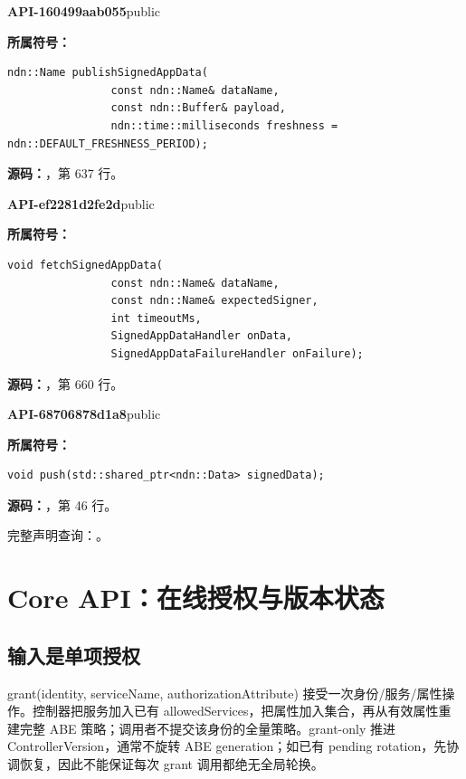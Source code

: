 \textbf{API-160499aab055}\quad public\par
\textbf{所属符号：}\par
\begin{Verbatim}[fontsize=\footnotesize,breaklines,breakanywhere]
ndn::Name publishSignedAppData(
                const ndn::Name& dataName,
                const ndn::Buffer& payload,
                ndn::time::milliseconds freshness = ndn::DEFAULT_FRESHNESS_PERIOD);
\end{Verbatim}
\textbf{源码：}，第 637 行。\par

\textbf{API-ef2281d2fe2d}\quad public\par
\textbf{所属符号：}\par
\begin{Verbatim}[fontsize=\footnotesize,breaklines,breakanywhere]
void fetchSignedAppData(
                const ndn::Name& dataName,
                const ndn::Name& expectedSigner,
                int timeoutMs,
                SignedAppDataHandler onData,
                SignedAppDataFailureHandler onFailure);
\end{Verbatim}
\textbf{源码：}，第 660 行。\par

\textbf{API-68706878d1a8}\quad public\par
\textbf{所属符号：}\par
\begin{Verbatim}[fontsize=\footnotesize,breaklines,breakanywhere]
void push(std::shared_ptr<ndn::Data> signedData);
\end{Verbatim}
\textbf{源码：}，第 46 行。\par

完整声明查询：。

\section{Core API：在线授权与版本状态}

\subsection{输入是单项授权}
grant(identity, serviceName, authorizationAttribute) 接受一次身份/服务/属性操作。控制器把服务加入已有 allowedServices，把属性加入集合，再从有效属性重建完整 ABE 策略；调用者不提交该身份的全量策略。grant-only 推进 ControllerVersion，通常不旋转 ABE generation；如已有 pending rotation，先协调恢复，因此不能保证每次 grant 调用都绝无全局轮换。

